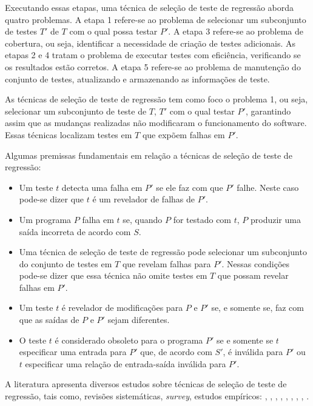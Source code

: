 Executando essas etapas, uma técnica de seleção de teste de regressão aborda quatro problemas. A etapa 1 refere-se ao problema de selecionar um subconjunto de testes $T'$ de $T$ com o qual possa testar $P'$. A etapa 3 refere-se ao problema de cobertura, ou seja, identificar a necessidade de criação de testes adicionais. As etapas 2 e 4 tratam o problema de executar testes com eficiência, verificando se os resultados estão corretos. A etapa 5 refere-se ao problema de manutenção do conjunto de testes, atualizando e armazenando as informações de teste.

As técnicas de seleção de teste de regressão tem como foco o problema 1, ou seja, selecionar um subconjunto de teste de $T$, $T'$ com o qual testar $P'$, garantindo assim que as mudanças realizadas não modificaram o funcionamento do software. Essas técnicas localizam testes em $T$ que expõem falhas em $P'$.

Algumas premissas fundamentais em relação a técnicas de seleção de teste de regressão: \cite{536955}
\begin{itemize}
    \item Um teste $t$ detecta uma falha em $P'$ se ele faz com que $P'$ falhe. Neste caso pode-se dizer que $t$ é um revelador de falhas de $P'$.
    \item Um programa $P$ falha em $t$ se, quando $P$ for testado com $t$, $P$ produzir uma saída incorreta de acordo com $S$.
    \item Uma técnica de seleção de teste de regressão pode selecionar um subconjunto do conjunto de testes em $T$ que revelam falhas para $P'$. Nessas condições pode-se dizer que essa técnica não omite testes em $T$ que possam revelar falhas em $P'$.
    \item Um teste $t$ é revelador de modificações para $P$ e $P'$ se, e somente se, faz com que as saídas de $P$ e $P'$ sejam diferentes.
    \item O teste $t$ é considerado obsoleto para o programa $P'$ se e somente se $t$ especificar uma entrada para $P'$ que, de acordo com $S'$, é inválida para $P'$ ou $t$ especificar uma relação de entrada-saída inválida para $P'$.
\end{itemize}

A literatura apresenta diversos estudos sobre técnicas de seleção de teste de regressão, tais como, revisões sistemáticas, \textit{survey}, estudos empíricos: \cite{WHITE1991}, \cite{536955}, \cite{630875}, \cite{Rosenblum97acomparative}, \cite{Rothermel2000},  \cite{Graves:2001:ESR:367008.367020},    \cite{ENGSTROM201014}, \cite{KAZMI2017}, \cite{ROMANO201862}.

